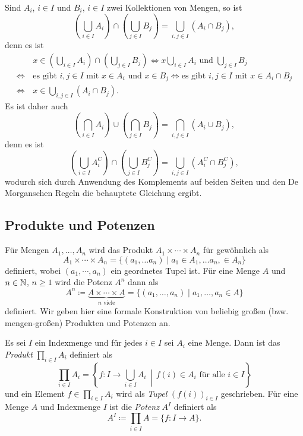 \begin{bem}
 Sind $A_i$, $i \in I$ und $B_i$, $i \in I$ zwei Kollektionen von Mengen, so ist
 \[
  \left( \bigcup_{i \in I} A_i \right) \cap \left( \bigcup_{j \in I} B_j \right)
  = \bigcup_{i,j \in I} (A_i \cap B_j),
 \]
 denn es ist
 \begin{align*}
      &\, x \in \left( \bigcup_{i \in I} A_i \right) \cap \left( \bigcup_{j \in I} B_j \right)
  \iff    \text{$x \bigcup_{i \in I} A_i$ und $\bigcup_{j \in I} B_j$} \\
  \iff&\, \text{es gibt $i,j \in I$ mit $x \in A_i$ und $x \in B_j$} 
  \iff    \text{es gibt $i,j \in I$ mit $x \in A_i \cap B_j$} \\
  \iff&\, x \in \bigcup_{i,j \in I} (A_i \cap B_j).
 \end{align*}
 Es ist daher auch
 \[
  \left( \bigcap_{i \in I} A_i \right) \cup \left( \bigcap_{j \in I} B_j \right)
  = \bigcap_{i,j \in I} (A_i \cup B_j),
 \]
 denn es ist
 \[
  \left( \bigcup_{i \in I} A_i^C \right) \cap \left( \bigcup_{j \in I} B_j^C \right)
  = \bigcup_{i,j \in I} (A_i^C \cap B_j^C),
 \]
 wodurch sich durch Anwendung des Komplements auf beiden Seiten und den De Morganschen Regeln die behauptete Gleichung ergibt.
\end{bem}




\subsection{Produkte und Potenzen}
Für Mengen $A_1, \dotsc, A_n$ wird das Produkt $A_1 \times \dotsb \times A_n$ für gewöhnlich als
\[
 A_1 \times \dotsb \times A_n
 = \{(a_1, \dotsc a_n) \mid a_1 \in A_1, \dotsc a_n, \in A_n\}
\]
definiert, wobei $(a_1, \dotsb, a_n)$ ein geordnetes Tupel ist. Für eine Menge $A$ und $n \in \mathbb{N}$, $n \geq 1$ wird die Potenz $A^n$ dann als
\[
 A^n
 \coloneqq \underbrace{A \times \dotsb \times A}_{\text{$n$ viele}}
 = \{(a_1, \dotsc, a_n) \mid a_1, \dotsc, a_n \in A\}
\]
definiert. Wir geben hier eine formale Konstruktion von beliebig großen (bzw. mengen-großen) Produkten und Potenzen an.


\begin{defi}
 Es sei $I$ ein Indexmenge und für jedes $i \in I$ sei $A_i$ eine Menge. Dann ist das \emph{Produkt} $\prod_{i \in I} A_i$ definiert als
 \[
  \prod_{i \in I} A_i
  = \left\{ f \colon I \to \bigcup_{i \in I} A_i \,\middle|\, \text{$f(i) \in A_i$ für alle $i \in I$} \right\}
 \]
 und ein Element $f \in \prod_{i \in I} A_i$ wird als \emph{Tupel} $(f(i))_{i \in I}$ geschrieben. Für eine Menge $A$ und Indexmenge $I$ ist die \emph{Potenz} $A^I$ definiert als
 \[
  A^I
  \coloneqq \prod_{i \in I} A
  = \{f \colon I \to A\}.
 \]

\end{defi}


